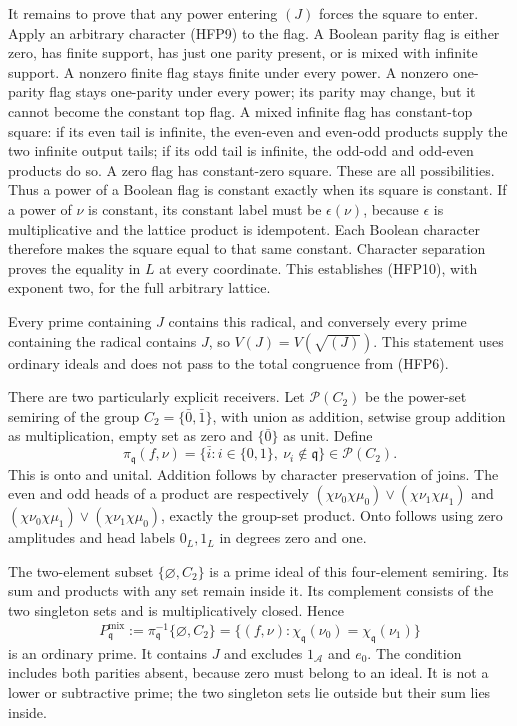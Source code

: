 It remains to prove that any power entering $(J)$ forces the
square to enter. Apply an arbitrary character (HFP9) to the
flag. A Boolean parity flag is either zero, has finite support,
has just one parity present, or is mixed with infinite support.
A nonzero finite flag stays finite under every power. A nonzero
one-parity flag stays one-parity under every power; its parity
may change, but it cannot become the constant top flag. A mixed
infinite flag has constant-top square: if its even tail is
infinite, the even-even and even-odd products supply the two
infinite output tails; if its odd tail is infinite, the odd-odd
and odd-even products do so. A zero flag has constant-zero square.
These are all possibilities. Thus a power of a Boolean flag
is constant exactly when its square is constant. If a power
of $\nu$ is constant, its constant label must be $\epsilon(\nu)$,
because $\epsilon$ is multiplicative and the lattice product
is idempotent. Each Boolean character therefore makes the
square equal to that same constant. Character separation proves
the equality in $L$ at every coordinate. This establishes
(HFP10), with exponent two, for the full arbitrary lattice.

Every prime containing $J$ contains this radical, and conversely
every prime containing the radical contains $J$, so
$V(J)=V(\sqrt{(J)})$. This statement uses ordinary ideals and
does not pass to the total congruence from (HFP6).

There are two particularly explicit receivers. Let
$\mathscr P(C_2)$ be the power-set semiring of the group
$C_2=\{\bar0,\bar1\}$, with union as addition, setwise group
addition as multiplication, empty set as zero and
$\{\bar0\}$ as unit. Define
\begin{equation}\tag{HFP11}
 \pi_{\mathfrak q}(f,\nu)
   =\{\bar i:i\in\{0,1\},\ \nu_i\notin\mathfrak q\}
                         \in\mathscr P(C_2).
\end{equation}
This is onto and unital. Addition follows by character
preservation of joins. The even and odd heads of a product
are respectively
$(\chi\nu_0\chi\mu_0)\vee(\chi\nu_1\chi\mu_1)$ and
$(\chi\nu_0\chi\mu_1)\vee(\chi\nu_1\chi\mu_0)$, exactly
the group-set product. Onto follows using zero amplitudes
and head labels $0_L,1_L$ in degrees zero and one.

The two-element subset $\{\varnothing,C_2\}$ is a prime ideal
of this four-element semiring. Its sum and products with any
set remain inside it. Its complement consists of the two
singleton sets and is multiplicatively closed. Hence
\begin{equation}\tag{HFP12}
 P^{\mathrm{mix}}_{\mathfrak q}
  :=\pi_{\mathfrak q}^{-1}\{\varnothing,C_2\}
  =\{(f,\nu):
          \chi_{\mathfrak q}(\nu_0)=\chi_{\mathfrak q}(\nu_1)\}
\end{equation}
is an ordinary prime. It contains $J$ and excludes
$1_{\mathcal A}$ and $e_0$. The condition includes both
parities absent, because zero must belong to an ideal.
It is not a lower or subtractive prime; the two singleton
sets lie outside but their sum lies inside.


